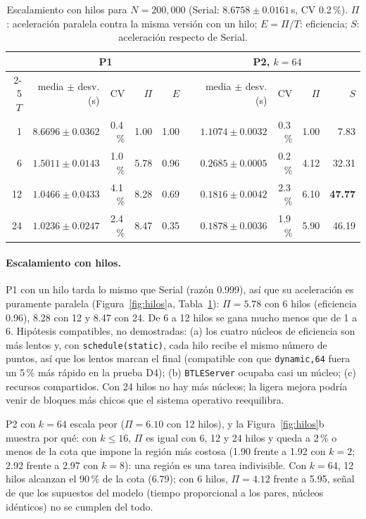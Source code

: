 \documentclass[11pt,letterpaper]{article}
\newcommand{\code}[1]{\texttt{#1}}
\begin{document}
\begin{table}[t]
\centering\small
\caption{Escalamiento con hilos para $N=200{,}000$ (Serial: $8.6758\pm0.0161$\,s, CV 0.2\,\%). $\Pi$: aceleración
paralela contra la misma versión con un hilo; $E=\Pi/T$: eficiencia; $S$: aceleración respecto de Serial.}
\label{tab:hilos}
\begin{tabular}{@{}r rrrr c rrrr@{}}
\toprule
 & \multicolumn{4}{c}{P1} & & \multicolumn{4}{c}{P2, $k=64$}\\
\cmidrule{2-5}\cmidrule{7-10}
$T$ & media $\pm$ desv. (s) & CV & $\Pi$ & $E$ & & media $\pm$ desv. (s) & CV & $\Pi$ & $S$\\
\midrule
 1 & $8.6696\pm0.0362$ & 0.4\,\% & 1.00 & 1.00 & & $1.1074\pm0.0032$ & 0.3\,\% & 1.00 & 7.83\\
 6 & $1.5011\pm0.0143$ & 1.0\,\% & 5.78 & 0.96 & & $0.2685\pm0.0005$ & 0.2\,\% & 4.12 & 32.31\\
12 & $1.0466\pm0.0433$ & 4.1\,\% & 8.28 & 0.69 & & $0.1816\pm0.0042$ & 2.3\,\% & 6.10 & \textbf{47.77}\\
24 & $1.0236\pm0.0247$ & 2.4\,\% & 8.47 & 0.35 & & $0.1878\pm0.0036$ & 1.9\,\% & 5.90 & 46.19\\
\bottomrule
\end{tabular}
\end{table}

\paragraph{Escalamiento con hilos.} P1 con un hilo tarda lo mismo que Serial (razón 0.999), así que su aceleración es
puramente paralela (Figura~\ref{fig:hilos}a, Tabla~\ref{tab:hilos}): $\Pi=5.78$ con 6 hilos (eficiencia 0.96), 8.28
con 12 y 8.47 con 24. De 6 a 12 hilos se gana mucho menos que de 1 a 6. Hipótesis compatibles, no demostradas: (a)
los cuatro núcleos de eficiencia son más lentos y, con \code{schedule(static)}, cada hilo recibe el mismo número de
puntos, así que los lentos marcan el final (compatible con que \code{dynamic,64} fuera un 5\,\% más rápido en la
prueba D4); (b) \code{BTLEServer} ocupaba casi un núcleo; (c) recursos compartidos. Con 24 hilos no hay más núcleos;
la ligera mejora podría venir de bloques más chicos que el sistema operativo reequilibra.

P2 con $k=64$ escala peor ($\Pi=6.10$ con 12 hilos), y la Figura~\ref{fig:hilos}b muestra por qué: con $k\le16$,
$\Pi$ es igual con 6, 12 y 24 hilos y queda a 2\,\% o menos de la cota que impone la región más costosa (1.90 frente
a 1.92 con $k=2$; 2.92 frente a 2.97 con $k=8$): una región es una tarea indivisible. Con $k=64$, 12 hilos alcanzan
el 90\,\% de la cota (6.79); con 6 hilos, $\Pi=4.12$ frente a 5.95, señal de que los supuestos del modelo (tiempo
proporcional a los pares, núcleos idénticos) no se cumplen del todo.
\end{document}
